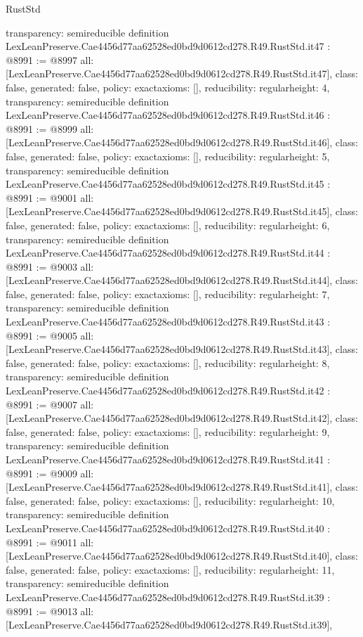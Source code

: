 \begin{lexlean}{RustStd}
\begin{coremodule}
{  transparency: semireducible
}
definition LexLeanPreserve.Cae4456d77aa62528ed0bd9d0612cd278.R49.RustStd.it47 : @8991 := @8997 {
  all: [LexLeanPreserve.Cae4456d77aa62528ed0bd9d0612cd278.R49.RustStd.it47],
  class: false,
  generated: false,
  policy: exact{axioms: []},
  reducibility: regular{height: 4},
  transparency: semireducible
}
definition LexLeanPreserve.Cae4456d77aa62528ed0bd9d0612cd278.R49.RustStd.it46 : @8991 := @8999 {
  all: [LexLeanPreserve.Cae4456d77aa62528ed0bd9d0612cd278.R49.RustStd.it46],
  class: false,
  generated: false,
  policy: exact{axioms: []},
  reducibility: regular{height: 5},
  transparency: semireducible
}
definition LexLeanPreserve.Cae4456d77aa62528ed0bd9d0612cd278.R49.RustStd.it45 : @8991 := @9001 {
  all: [LexLeanPreserve.Cae4456d77aa62528ed0bd9d0612cd278.R49.RustStd.it45],
  class: false,
  generated: false,
  policy: exact{axioms: []},
  reducibility: regular{height: 6},
  transparency: semireducible
}
definition LexLeanPreserve.Cae4456d77aa62528ed0bd9d0612cd278.R49.RustStd.it44 : @8991 := @9003 {
  all: [LexLeanPreserve.Cae4456d77aa62528ed0bd9d0612cd278.R49.RustStd.it44],
  class: false,
  generated: false,
  policy: exact{axioms: []},
  reducibility: regular{height: 7},
  transparency: semireducible
}
definition LexLeanPreserve.Cae4456d77aa62528ed0bd9d0612cd278.R49.RustStd.it43 : @8991 := @9005 {
  all: [LexLeanPreserve.Cae4456d77aa62528ed0bd9d0612cd278.R49.RustStd.it43],
  class: false,
  generated: false,
  policy: exact{axioms: []},
  reducibility: regular{height: 8},
  transparency: semireducible
}
definition LexLeanPreserve.Cae4456d77aa62528ed0bd9d0612cd278.R49.RustStd.it42 : @8991 := @9007 {
  all: [LexLeanPreserve.Cae4456d77aa62528ed0bd9d0612cd278.R49.RustStd.it42],
  class: false,
  generated: false,
  policy: exact{axioms: []},
  reducibility: regular{height: 9},
  transparency: semireducible
}
definition LexLeanPreserve.Cae4456d77aa62528ed0bd9d0612cd278.R49.RustStd.it41 : @8991 := @9009 {
  all: [LexLeanPreserve.Cae4456d77aa62528ed0bd9d0612cd278.R49.RustStd.it41],
  class: false,
  generated: false,
  policy: exact{axioms: []},
  reducibility: regular{height: 10},
  transparency: semireducible
}
definition LexLeanPreserve.Cae4456d77aa62528ed0bd9d0612cd278.R49.RustStd.it40 : @8991 := @9011 {
  all: [LexLeanPreserve.Cae4456d77aa62528ed0bd9d0612cd278.R49.RustStd.it40],
  class: false,
  generated: false,
  policy: exact{axioms: []},
  reducibility: regular{height: 11},
  transparency: semireducible
}
definition LexLeanPreserve.Cae4456d77aa62528ed0bd9d0612cd278.R49.RustStd.it39 : @8991 := @9013 {
  all: [LexLeanPreserve.Cae4456d77aa62528ed0bd9d0612cd278.R49.RustStd.it39],
}
\end{coremodule}
\end{lexlean}

